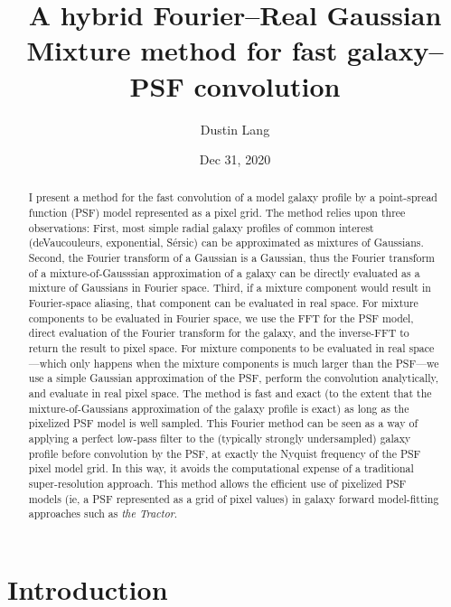 \documentclass[11pt,letterpaper]{aastex63}
\newcommand{\project}[1]{\textsl{#1}}
\newcommand{\sersic}{S\'ersic}
\begin{document}
\title{A hybrid Fourier--Real Gaussian Mixture method for fast galaxy--PSF convolution}
\author{Dustin Lang}
\date{Dec 31, 2020}

\begin{abstract}
  I present a method for the fast convolution of a model galaxy
  profile by a point-spread function (PSF) model represented as a pixel grid.
  The method relies upon three
  observations: First, most simple radial galaxy profiles of common interest
  (deVaucouleurs, exponential, \sersic) can be approximated as
  mixtures of Gaussians.  Second, the Fourier transform of a Gaussian
  is a Gaussian, thus the Fourier transform of a mixture-of-Gausssian
  approximation of a galaxy can be directly evaluated as a mixture of Gaussians
  in Fourier space.
  Third, if a mixture component would result in Fourier-space aliasing, that
  component can be evaluated in real space.
  For mixture components to be evaluated in Fourier space, we
  use the FFT for the PSF model, direct evaluation of the Fourier
  transform for the galaxy, and the inverse-FFT to return the result to
  pixel space.
  For mixture components to be evaluated in real space---which only happens when the mixture
  components is much larger than the PSF---we use a simple Gaussian approximation of
  the PSF, perform the convolution analytically, and evaluate in real pixel space.
  The method is fast and exact (to the extent that the mixture-of-Gaussians
  approximation of the galaxy profile is exact) as long as the pixelized PSF
  model is well sampled.
  This Fourier method can be seen as a way of applying a perfect low-pass filter to
  the (typically strongly undersampled) galaxy profile before convolution by
  the PSF, at exactly the Nyquist frequency of the PSF pixel model grid.  In
  this way, it avoids the computational expense of a traditional super-resolution
  approach.
  This method allows
  the efficient use of pixelized PSF models (ie, a PSF represented as
  a grid of pixel values) in galaxy forward model-fitting approaches such as
  \project{the Tractor}.
\end{abstract}

\section{Introduction}
\end{document}
